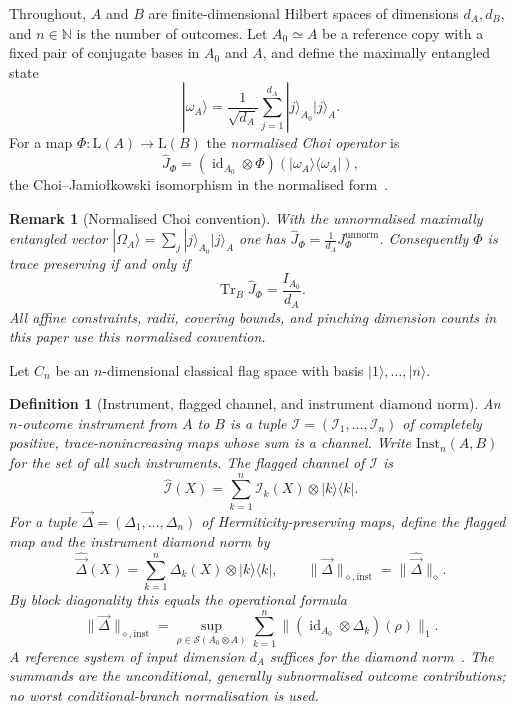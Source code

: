 \documentclass[11pt,a4paper]{article}
\newtheorem{definition}[theorem]{Definition}
\newtheorem{remark}[theorem]{Remark}
\newcommand{\Lin}{\mathrm{L}}
\newcommand{\Sstate}{\mathcal{S}}
\newcommand{\Inst}{\mathrm{Inst}}
\newcommand{\Tr}{\operatorname{Tr}}
\newcommand{\id}{\operatorname{id}}
\newcommand{\Jhat}{\widehat J}
\newcommand{\vD}{\vec{\Delta}}
\begin{document}
Throughout, $A$ and $B$ are finite-dimensional Hilbert spaces of dimensions $d_A,d_B$, and $n\in\mathbb N$ is the number of outcomes. Let $A_0\simeq A$ be a reference copy with a fixed pair of conjugate bases in $A_0$ and $A$, and define the maximally entangled state
\[
|\omega_A\rangle=\frac1{\sqrt{d_A}}\sum_{j=1}^{d_A}|j\rangle_{A_0}|j\rangle_A.
\]
For a map $\Phi:\Lin(A)\to\Lin(B)$ the \emph{normalised Choi operator} is
\[
\Jhat_\Phi=(\id_{A_0}\otimes\Phi)(|\omega_A\rangle\langle\omega_A|),
\]
the Choi--Jamio{\l}kowski isomorphism in the normalised form~\cite{Choi1975,Jamiolkowski1972}.

\begin{remark}[Normalised Choi convention]
\label{rem:choi-convention}
With the unnormalised maximally entangled vector $|\Omega_A\rangle=\sum_j|j\rangle_{A_0}|j\rangle_A$ one has $\Jhat_\Phi=\tfrac1{d_A}J_\Phi^{\mathrm{unnorm}}$. Consequently $\Phi$ is trace preserving if and only if
\[
\Tr_B\Jhat_\Phi=\frac{I_{A_0}}{d_A}.
\]
All affine constraints, radii, covering bounds, and pinching dimension counts in this paper use this normalised convention.
\end{remark}

Let $C_n$ be an $n$-dimensional classical flag space with basis $|1\rangle,\dots,|n\rangle$.

\begin{definition}[Instrument, flagged channel, and instrument diamond norm]
An $n$-outcome instrument from $A$ to $B$ is a tuple $\mathcal I=(\mathcal I_1,\dots,\mathcal I_n)$ of completely positive, trace-nonincreasing maps whose sum is a channel. Write $\Inst_n(A,B)$ for the set of all such instruments. The flagged channel of $\mathcal I$ is
\[
\widehat{\mathcal I}(X)=\sum_{k=1}^n\mathcal I_k(X)\otimes|k\rangle\langle k|.
\]
For a tuple $\vD=(\Delta_1,\dots,\Delta_n)$ of Hermiticity-preserving maps, define the flagged map and the instrument diamond norm by
\[
\widehat{\vD}(X)=\sum_{k=1}^n\Delta_k(X)\otimes|k\rangle\langle k|,
\qquad
\|\vD\|_{\diamond,\mathrm{inst}}=\|\widehat{\vD}\|_\diamond.
\]
By block diagonality this equals the operational formula
\[
\|\vD\|_{\diamond,\mathrm{inst}}
=\sup_{\rho\in\Sstate(A_0\otimes A)}
\sum_{k=1}^n\|(\id_{A_0}\otimes\Delta_k)(\rho)\|_1.
\]
A reference system of input dimension $d_A$ suffices for the diamond norm~\cite{Watrous2018}. The summands are the unconditional, generally subnormalised outcome contributions; no worst conditional-branch normalisation is used.
\end{definition}
\end{document}

